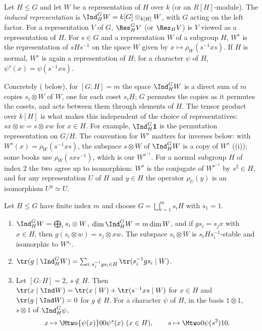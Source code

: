 \begin{definition}\label{def:reps:induction}
Let $H\le G$ and let $W$ be a representation of $H$ over $k$ (or an $R[H]$-module). The \emph{induced representation} is
$\Ind_H^GW=k[G]\otimes_{k[H]}W$, with $G$ acting on the left factor. For a representation $V$ of $G$, $\Res^G_HV$ (or $\Res_HV$) is $V$ viewed as a
representation of $H$. For $s\in G$ and a representation $W$ of a subgroup $H$, $W^s$ is the representation of $sHs^{-1}$ on the space $W$
given by $x\mapsto\rho_W(s^{-1}xs)$. If $H$ is normal, $W^s$ is again a representation of $H$; for a character $\psi$ of $H$, $\psi^s(x)=\psi(s^{-1}xs)$.
\end{definition}

Concretely ( below), for $[G:H]=m$ the space $\Ind_H^GW$ is a direct sum of $m$ copies $s_i\otimes W$ of $W$, one for
each coset $s_iH$; $G$ permutes the copies as it permutes the cosets, and acts between them through elements of $H$. The tensor
product over $k[H]$ is what makes this independent of the choice of representatives: $sx\otimes w=s\otimes xw$ for $x\in H$. For example,
$\Ind_H^G\mathbf1$ is the permutation representation on $G/H$. The convention for $W^s$ matters for inverses below: with
$W^s(x)=\rho_W(s^{-1}xs)$, the subspace $s\otimes W$ of $\Ind_H^GW$ is a copy of $W^s$ ((i)); some books use
$\rho_W(sxs^{-1})$, which is our $W^{s^{-1}}$. For a normal subgroup $H$ of index $2$ the two agree up to isomorphism: $W^s$ is the conjugate of
$W^{s^{-1}}$ by $s^2\in H$, and for any representation $U$ of $H$ and $y\in H$ the operator $\rho_U(y)$ is an isomorphism $U^y\simeq U$.

\begin{proposition}\label{prop:reps:induction}
Let $H\le G$ have finite index $m$ and choose $G=\bigsqcup_{i=1}^ms_iH$ with $s_1=1$.
\begin{enumerate}[label=(\roman*)]
\item $\Ind_H^GW=\bigoplus_is_i\otimes W$, $\dim\Ind_H^GW=m\dim W$, and if $gs_i=s_jx$ with $x\in H$, then $g(s_i\otimes w)=s_j\otimes xw$. The subspace
$s_i\otimes W$ is $s_iHs_i^{-1}$-stable and isomorphic to $W^{s_i}$.
\item $\tr(g\mid\Ind_H^GW)=\sum_{i:\,s_i^{-1}gs_i\in H}\tr(s_i^{-1}gs_i\mid W)$.
\item Let $[G:H]=2$, $s\notin H$. Then $\tr(x\mid\Ind W)=\tr(x\mid W)+\tr(s^{-1}xs\mid W)$ for $x\in H$ and $\tr(g\mid\Ind W)=0$ for $g\notin H$. For a
character $\psi$ of $H$, in the basis $1\otimes1$, $s\otimes1$ of $\Ind_H^G\psi$,
\[
x\mapsto\Mtwo{\psi(x)}00{\psi^s(x)}\ (x\in H),\qquad s\mapsto\Mtwo0{\psi(s^2)}10.
\]
\end{enumerate}
\end{proposition}

